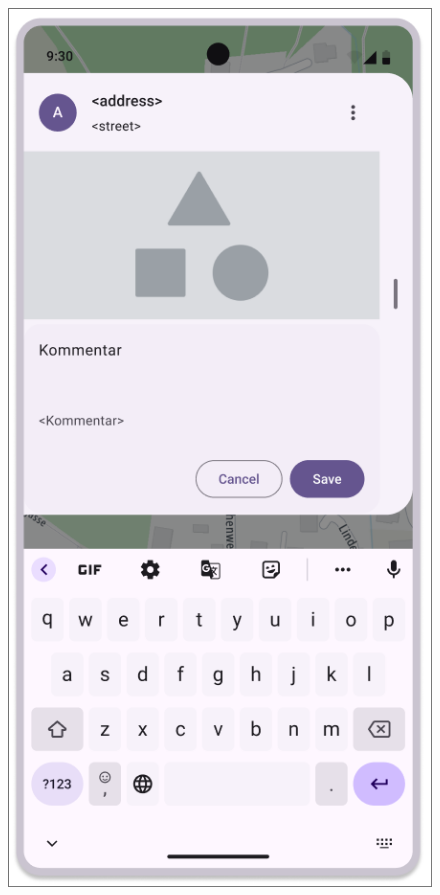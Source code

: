 \begin{figure}[H]
    \centering
    \begin{minipage}{0.3\textwidth}
        \centering
        \includegraphics[width=\textwidth]{images/paul/wireframes/detailsScreen.png}

\end{minipage}
\end{figure}
